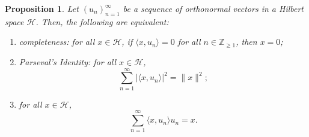 \documentclass[a4paper, openany]{memoir}
\theoremstyle{definition}
\theoremstyle{plain}
\newtheorem{proposition}[definition]{Proposition}
\begin{document}
    \begin{proposition}
        Let $(u_n)_{n=1}^\infty$ be a sequence of orthonormal vectors in a Hilbert space $\mathcal{H}$. Then, the following are equivalent:
        \begin{enumerate}
            \item \emph{completeness}: for all $x \in \mathcal{H}$, if $\langle x, u_n \rangle = 0$ for all $n \in \mathbb{Z}_{\geq 1}$, then $x = 0$;
            \item \emph{Parseval's Identity}: for all $x \in \mathcal{H}$,
            \[\sum_{n=1}^\infty |\langle x, u_n \rangle|^2 = \lVert x \rVert^2;\]
            \item for all $x \in \mathcal{H}$,
            \[\sum_{n=1}^\infty \langle x, u_n \rangle u_n = x.\]
        \end{enumerate}
    \end{proposition}
\end{document}
